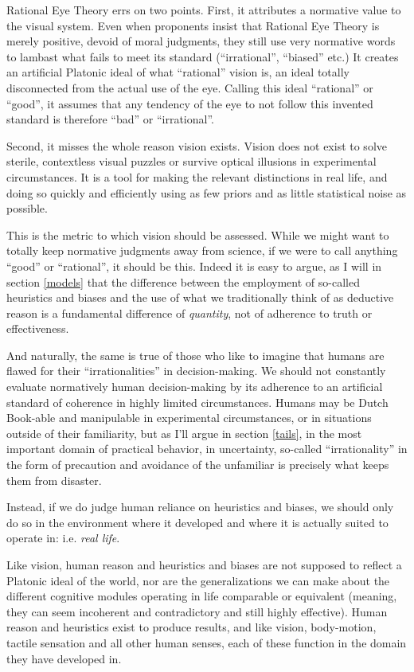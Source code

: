 \documentclass{article}
\begin{document}
Rational Eye Theory errs on two points.
First, it attributes a normative value to the visual system.
Even when proponents insist that Rational Eye Theory is merely positive, devoid of moral judgments, they still use very normative words to lambast what fails to meet its standard (``irrational'', ``biased'' etc.)
It creates an artificial Platonic ideal of what ``rational'' vision is, an ideal totally disconnected from the actual use of the eye.
Calling this ideal ``rational'' or ``good'', it assumes that any tendency of the eye to not follow this invented standard is therefore ``bad'' or ``irrational''.

Second, it misses the whole reason vision exists.
Vision does not exist to solve sterile, contextless visual puzzles or survive optical illusions in experimental circumstances.
It is a tool for making the relevant distinctions in real life, and doing so quickly and efficiently using as few priors and as little statistical noise as possible.

This is the metric to which vision should be assessed.
While we might want to totally keep normative judgments away from science, if we were to call anything ``good'' or ``rational'', it should be this.
Indeed it is easy to argue, as I will in section \ref{models} that the difference between the employment of so-called heuristics and biases and the use of what we traditionally think of as deductive reason is a fundamental difference of \emph{quantity}, not of adherence to truth or effectiveness.

And naturally, the same is true of those who like to imagine that humans are flawed for their ``irrationalities'' in decision-making.
We should not constantly evaluate normatively human decision-making by its adherence to an artificial standard of coherence in highly limited circumstances.
Humans may be Dutch Book-able and manipulable in experimental circumstances, or in situations outside of their familiarity, but as I'll argue in section \ref{tails}, in the most important domain of practical behavior, in uncertainty, so-called ``irrationality'' in the form of precaution and avoidance of the unfamiliar is precisely what keeps them from disaster.

Instead, if we do judge human reliance on heuristics and biases, we should only do so in the environment where it developed and where it is actually suited to operate in: i.e. \emph{real life}.

Like vision, human reason and heuristics and biases are not supposed to reflect a Platonic ideal of the world, nor are the generalizations we can make about the different cognitive modules operating in life comparable or equivalent (meaning, they can seem incoherent and contradictory and still highly effective).
Human reason and heuristics exist to produce results, and like vision, body-motion, tactile sensation and all other human senses, each of these function in the domain they have developed in.
\end{document}
